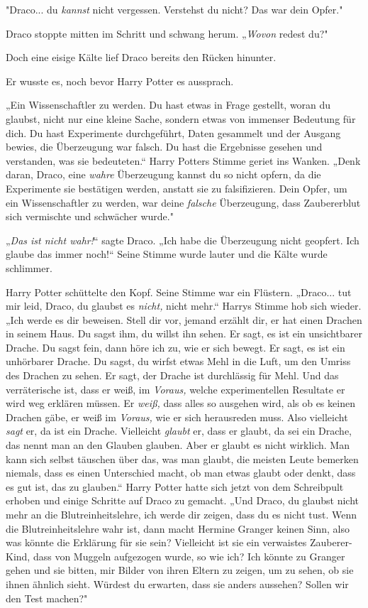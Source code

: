 {"Draco... du \emph{kannst} nicht vergessen. Verstehst du nicht? Das war dein Opfer."

Draco stoppte mitten im Schritt und schwang herum. „\emph{Wovon} redest du?"

Doch eine eisige Kälte lief Draco bereits den Rücken hinunter.

Er wusste es, noch bevor Harry Potter es aussprach.

„Ein Wissenschaftler zu werden. Du hast etwas in Frage gestellt, woran du glaubst, nicht nur eine kleine Sache, sondern etwas von immenser Bedeutung für dich. Du hast Experimente durchgeführt, Daten gesammelt und der Ausgang bewies, die Überzeugung war falsch. Du hast die Ergebnisse gesehen und verstanden, was sie bedeuteten.“ Harry Potters Stimme geriet ins Wanken. „Denk daran, Draco, eine \emph{wahre} Überzeugung kannst du so nicht opfern, da die Experimente sie bestätigen werden, anstatt sie zu falsifizieren. Dein Opfer, um ein Wissenschaftler zu werden, war deine \emph{falsche} Überzeugung, dass Zaubererblut sich vermischte und schwächer wurde."

„\emph{Das ist nicht wahr!}“ sagte Draco. „Ich habe die Überzeugung nicht geopfert. Ich glaube das immer noch!“ Seine Stimme wurde lauter und die Kälte wurde schlimmer.

Harry Potter schüttelte den Kopf. Seine Stimme war ein Flüstern. „Draco... tut mir leid, Draco, du glaubst es \emph{nicht,} nicht mehr.“ Harrys Stimme hob sich wieder. „Ich werde es dir beweisen. Stell dir vor, jemand erzählt dir, er hat einen Drachen in seinem Haus. Du sagst ihm, du willst ihn sehen. Er sagt, es ist ein unsichtbarer Drache. Du sagst fein, dann höre ich zu, wie er sich bewegt. Er sagt, es ist ein unhörbarer Drache. Du sagst, du wirfst etwas Mehl in die Luft, um den Umriss des Drachen zu sehen. Er sagt, der Drache ist durchlässig für Mehl. Und das verräterische ist, dass er weiß, im \emph{Voraus,} welche experimentellen Resultate er wird weg erklären müssen. Er \emph{weiß,} dass alles so ausgehen wird, als ob es keinen Drachen gäbe, er weiß im \emph{Voraus,} wie er sich herausreden muss. Also vielleicht \emph{sagt} er, da ist ein Drache. Vielleicht \emph{glaubt} er, dass er glaubt, da sei ein Drache, das nennt man an den Glauben glauben. Aber er glaubt es nicht wirklich. Man kann sich selbst täuschen über das, was man glaubt, die meisten Leute bemerken niemals, dass es einen Unterschied macht, ob man etwas glaubt oder denkt, dass es gut ist, das zu glauben.“ Harry Potter hatte sich jetzt von dem Schreibpult erhoben und einige Schritte auf Draco zu gemacht. „Und Draco, du glaubst nicht mehr an die Blutreinheitslehre, ich werde dir zeigen, dass du es nicht tust. Wenn die Blutreinheitslehre wahr ist, dann macht Hermine Granger keinen Sinn, also was könnte die Erklärung für sie sein? Vielleicht ist sie ein verwaistes Zauberer-Kind, dass von Muggeln aufgezogen wurde, so wie ich? Ich könnte zu Granger gehen und sie bitten, mir Bilder von ihren Eltern zu zeigen, um zu sehen, ob sie ihnen ähnlich sieht. Würdest du erwarten, dass sie anders aussehen? Sollen wir den Test machen?"

}
